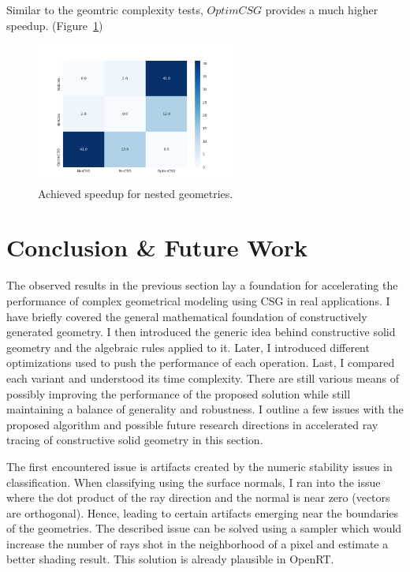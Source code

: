 \documentclass[a4paper,11pt,oneside]{article}
\begin{document}
Similar to the geomtric complexity tests, $OptimCSG$ provides a much higher speedup. (Figure~\ref{sec5.1:heatmap_nesting})

\begin{figure}[H]
	\centering
	\includegraphics[width=0.6\textwidth]{section5/plots/nesting_speedup.png}
	\caption{Achieved speedup for nested geometries.}
	\label{sec5.1:heatmap_nesting}
\end{figure}


\section{Conclusion \& Future Work}


The observed results in the previous section lay a foundation for accelerating the performance of complex geometrical modeling using CSG in real applications. I have briefly covered the general mathematical foundation of constructively generated geometry. I then introduced the generic idea behind constructive solid geometry and the algebraic rules applied to it. Later, I introduced different optimizations used to push the performance of each operation. Last, I compared each variant and understood its time complexity. There are still various means of possibly improving the performance of the proposed solution while still maintaining a balance of generality and robustness. I outline a few issues with the proposed algorithm and possible future research directions in accelerated ray tracing of constructive solid geometry in this section.

The first encountered issue is artifacts created by the numeric stability issues in classification. When classifying using the surface normals, I ran into the issue where the dot product of the ray direction and the normal is near zero (vectors are orthogonal). Hence, leading to certain artifacts emerging near the boundaries of the geometries. The described issue can be solved using a sampler which would increase the number of rays shot in the neighborhood of a pixel and estimate a better shading result. This solution is already plausible in OpenRT.
\end{document}

